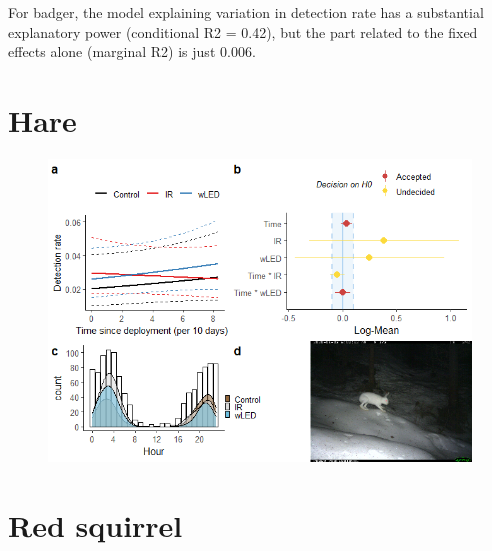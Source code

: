 \begin{table}[ht]
\begin{figure}
\end{figure}

For badger, the model explaining variation in detection rate has a substantial explanatory power (conditional R2 = 0.42), but the part related to the fixed effects alone (marginal R2) is just 0.006. %









\newpage
\section{Hare}


\begin{figure}
		  \centering
	\includegraphics[scale=.9]{../R/glmm_sp_files/figure-html/hare2-1.png}

\end{figure}





\newpage
\section{Red squirrel}


\end{table}
